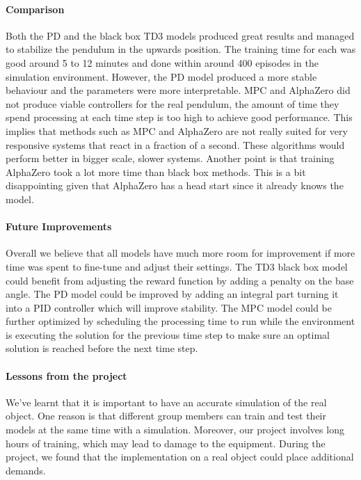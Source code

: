 \documentclass{LTHtwocol} %
\begin{document}
\paragraph{Comparison} Both the PD and the black box TD3 models produced great results and managed to stabilize the pendulum in the upwards position. The training time for each was good around 5 to 12 minutes and done within around 400 episodes in the simulation environment. However, the PD model produced a more stable behaviour and the parameters were more interpretable. MPC and AlphaZero did not produce viable controllers for the real pendulum, the amount of time they spend processing at each time step is too high to achieve good performance. This implies that methods such as MPC and AlphaZero are not really suited for very responsive systems that react in a fraction of a second. These algorithms would perform better in bigger scale, slower systems. Another point is that training AlphaZero took a lot more time than black box methods. This is a bit disappointing given that AlphaZero has a head start since it already knows the model.

\paragraph{Future Improvements} Overall we believe that all models have much more room for improvement if more time was spent to fine-tune and adjust their settings. The TD3 black box model could benefit from adjusting the reward function by adding a penalty on the base angle. The PD model could be improved by adding an integral part turning it into a PID controller which will improve stability. The MPC model could be further optimized by scheduling the processing time to run while the environment is executing the solution for the previous time step to make sure an optimal solution is reached before the next time step.

\paragraph{Lessons from the project} We've learnt that it is important to have an accurate simulation of the real object. One reason is that different group members can train and test their models at the same time with a simulation. Moreover, our project involves long hours of training, which may lead to damage to the equipment. During the project, we found that the implementation on a real object could place additional demands.


\printbibliography
\end{document}
